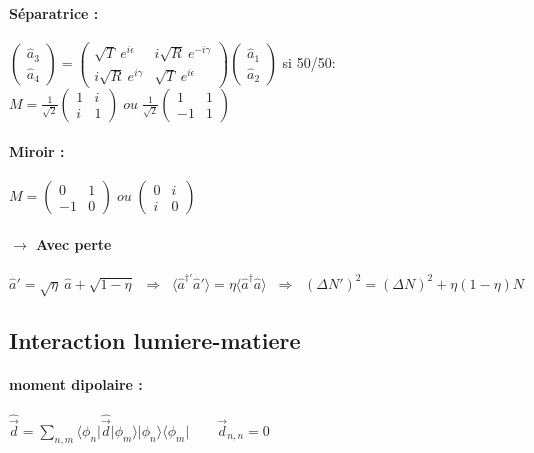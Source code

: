 \documentclass{article}
\begin{document}
\paragraph{Séparatrice : } $\begin{pmatrix}
    \hat{a}_3 \\
    \hat{a}_4
\end{pmatrix} = \begin{pmatrix}
    \sqrt{T}\:e^{i\epsilon} & i\sqrt{R}\:e^{-i\gamma} \\
    i\sqrt{R}\:e^{i\gamma} & \sqrt{T}\:e^{i\epsilon}
\end{pmatrix}\begin{pmatrix}
    \hat{a}_1 \\
    \hat{a}_2
\end{pmatrix}
$  si 50/50: $M=\frac{1}{\sqrt{2}}\begin{pmatrix}
    1 & i \\
    i & 1
\end{pmatrix}\; ou\; \frac{1}{\sqrt{2}}\begin{pmatrix}
    1 & 1 \\
    -1 & 1
\end{pmatrix}
$

\paragraph{Miroir :} $M=\begin{pmatrix}
    0 & 1 \\
    -1 & 0
\end{pmatrix}\;ou\;
\begin{pmatrix}
    0 & i \\
    i & 0
\end{pmatrix}$

\paragraph{$\rightarrow$ Avec perte} $\hat{a}' = \sqrt{\eta}\: \hat{a} + \sqrt{1-\eta} \;\; \Rightarrow \;\; \langle\hat{a}^{\dagger'}\hat{a}'\rangle = \eta\langle\hat{a}^{\dagger}\hat{a}\rangle  \;\; \Rightarrow \;\; (\Delta N')^2 = (\Delta N)^2 +\eta(1-\eta)N$

\subsection{Interaction lumiere-matiere}

\paragraph{moment dipolaire :} $\hat{\vec{d}} = \sum_{n,m} \langle\phi_n\vert\hat{\vec{d}}\vert\phi_m\rangle\vert\phi_n\rangle\langle\phi_m\vert \qquad \vec{d}_{n,n}=0$
\end{document}
